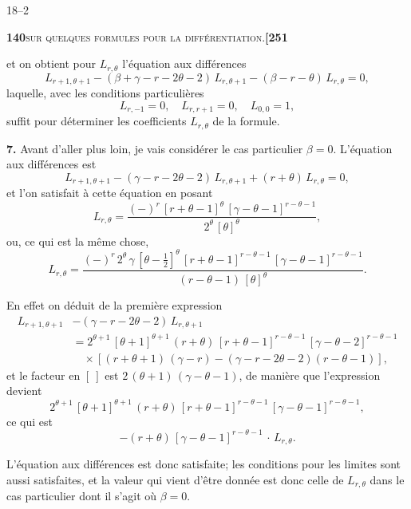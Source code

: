 \documentclass[11pt]{article}
\begin{document}
\hfill 18--2

\newpage

\noindent\textbf{140}\hfill\textsc{sur quelques formules pour la différentiation.}\hfill\textbf{[251}

\medskip

\noindent et on obtient pour $L_{r,\theta}$ l'équation aux différences
\[
L_{r+1,\theta+1} - (\beta + \gamma - r - 2\theta - 2)\,L_{r,\theta+1} - (\beta - r - \theta)\,L_{r,\theta} = 0,
\]
laquelle, avec les conditions particulières
\[
L_{r,-1} = 0,\quad L_{r,r+1} = 0,\quad L_{0,0} = 1,
\]
suffit pour déterminer les coefficients $L_{r,\theta}$ de la formule.

\medskip

\textbf{7.} Avant d'aller plus loin, je vais considérer le cas particulier $\beta = 0$. L'équation aux différences est
\[
L_{r+1,\theta+1} - (\gamma - r - 2\theta - 2)\,L_{r,\theta+1} + (r + \theta)\,L_{r,\theta} = 0,
\]
et l'on satisfait à cette équation en posant
\[
L_{r,\theta} = \frac{(-)^r\,[r + \theta - 1]^{\theta}\,[\gamma - \theta - 1]^{r-\theta-1}}{2^{\theta}\,[\theta]^{\theta}},
\]
ou, ce qui est la même chose,
\[
L_{r,\theta} = \frac{(-)^r\,2^{\theta}\,\gamma\,[\theta - \tfrac{1}{2}]^{\theta}\,[r + \theta - 1]^{r-\theta-1}\,[\gamma - \theta - 1]^{r-\theta-1}}{(r - \theta - 1)\,[\theta]^{\theta}}.
\]

En effet on déduit de la première expression
\begin{align*}
L_{r+1,\theta+1} &- (\gamma - r - 2\theta - 2)\,L_{r,\theta+1}\\
&= 2^{\theta+1}\,[\theta + 1]^{\theta+1}\,(r + \theta)\,[r + \theta - 1]^{r-\theta-1}\,[\gamma - \theta - 2]^{r-\theta-1}\\
&\quad \times [(r + \theta + 1)\,(\gamma - r) - (\gamma - r - 2\theta - 2)(r - \theta - 1)],
\end{align*}
et le facteur en $[\ ]$ est $2\,(\theta + 1)\,(\gamma - \theta - 1)$, de manière que l'expression devient
\[
2^{\theta+1}\,[\theta + 1]^{\theta+1}\,(r + \theta)\,[r + \theta - 1]^{r-\theta-1}\,[\gamma - \theta - 1]^{r-\theta-1},
\]
ce qui est
\[
- (r + \theta)\,[\gamma - \theta - 1]^{r-\theta-1}\,\cdot\,L_{r,\theta}.
\]

L'équation aux différences est donc satisfaite; les conditions pour les limites sont aussi satisfaites, et la valeur qui vient d'être donnée est donc celle de $L_{r,\theta}$ dans le cas particulier dont il s'agit où $\beta = 0$.

\medskip
\end{document}
